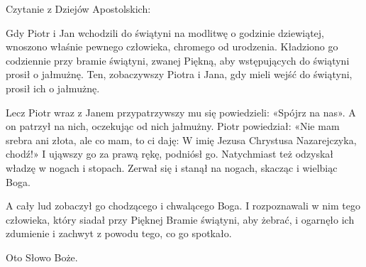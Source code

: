 \indent Czytanie z Dziejów Apostolskich:

Gdy Piotr i Jan wchodzili do świątyni na modlitwę o godzinie dziewiątej, wnoszono właśnie pewnego człowieka, chromego od urodzenia. Kładziono go codziennie przy bramie świątyni, zwanej Piękną, aby wstępujących do świątyni prosił o jałmużnę. Ten, zobaczywszy Piotra i Jana, gdy mieli wejść do świątyni, prosił ich o jałmużnę.

Lecz Piotr wraz z Janem przypatrzywszy mu się powiedzieli: «Spójrz na nas». A on patrzył na nich, oczekując od nich jałmużny. Piotr powiedział: «Nie mam srebra ani złota, ale co mam, to ci daję: W imię Jezusa Chrystusa Nazarejczyka, chodź!» I ująwszy go za prawą rękę, podniósł go. Natychmiast też odzyskał władzę w nogach i stopach. Zerwał się i stanął na nogach, skacząc i wielbiąc Boga.

A cały lud zobaczył go chodzącego i chwalącego Boga. I rozpoznawali w nim tego człowieka, który siadał przy Pięknej Bramie świątyni, aby żebrać, i ogarnęło ich zdumienie i zachwyt z powodu tego, co go spotkało.

Oto Słowo Boże.